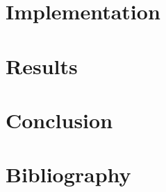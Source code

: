 \documentclass[a4paper, twoside, 11pt]{report}
\theoremstyle{theorem}
\theoremstyle{remark}
\theoremstyle{exemple}
\begin{document}
\chapter{Implementation}


\chapter{Results}


\chapter*{Conclusion}


\chapter*{Bibliography}
\end{document}
